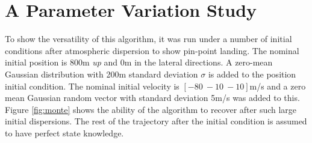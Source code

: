 \section{A Parameter Variation Study}
To show the versatility of this algorithm, it was run under a number of initial conditions after atmospheric dispersion to show pin-point landing. The nominal initial position is 800m \textit{up} and 0m in the lateral directions. A zero-mean Gaussian distribution with 200m standard deviation $\sigma$ is added to the position initial condition. The nominal initial velocity is $[-80 \ -10 \ -10]$m/s and a zero mean Gaussian random vector with standard deviation 5m/s was added to this. Figure \ref{fig:monte} shows the ability of the algorithm to recover after such large initial dispersions. The rest of the trajectory after the initial condition is assumed to have perfect state knowledge.


